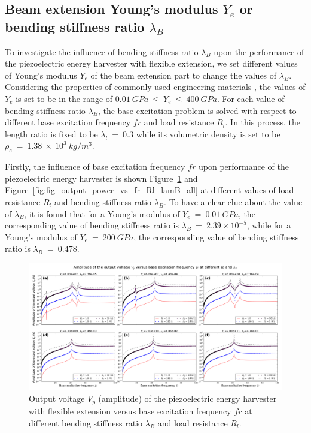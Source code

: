 \documentclass{elsarticle}
\begin{document}
\subsection{Beam extension Young's modulus $Y_e$ or bending stiffness ratio $\lambda_B$}

To investigate the influence of bending stiffness ratio $\lambda_B$ upon the performance of the piezoelectric energy harvester with flexible extension, we set different values of Young's modulus $Y_e$ of the beam extension part to change the values of $\lambda_B$. Considering the properties of commonly used engineering materials \cite{warlimont2018springer}, the values of $Y_e$ is set to be in the range of $0.01\ GPa\ \leq\ Y_e\ \leq\ 400\ GPa$. For each value of bending stiffness ratio $\lambda_B$, the base excitation problem is solved with respect to different base excitation frequency $fr$ and load resistance $R_l$. In this process, the length ratio is fixed to be $\lambda_l\ =\ 0.3$ while its volumetric density is set to be $\rho_e\ =\ 1.38\ \times\ 10^3\ kg/m^3$.

Firstly, the influence of base excitation frequency $fr$ upon performance of the piezoelectric energy harvester is shown Figure~\ref{fig:fig_output_voltage_vs_fr_Rl_lamB_all} and Figure~\ref{fig:fig_output_power_vs_fr_Rl_lamB_all} at different values of load resistance $R_l$ and bending stiffness ratio $\lambda_B$. To have a clear clue about the value of $\lambda_B$, it is found that for a Young's modulus of $Y_e\ =\ 0.01\ GPa$, the corresponding value of bending stiffness ratio is $\lambda_B\ =\ 2.39\times10^{-5}$, while for a Young's modulus of $Y_e\ =\ 200\ GPa$, the corresponding value of bending stiffness ratio is $\lambda_B\ =\ 0.478$.

\begin{figure}[!htbp]
    \centering
    \includegraphics[width=\textwidth]{./fig_output_voltage_vs_fr_Rl_lamB_all}
    \caption{Output voltage $V_p$ (amplitude) of the piezoelectric energy harvester with flexible extension versus base excitation frequency $fr$ at different bending stiffness ratio $\lambda_B$ and load resistance $R_l$. \color{red}{to be revised in the legend. change figure title} }
    \label{fig:fig_output_voltage_vs_fr_Rl_lamB_all}
\end{figure}
\end{document}

